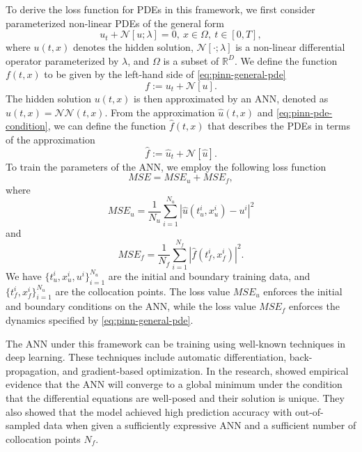 To derive the loss function for \glspl{PDE} in this framework, we first consider parameterized non-linear \glspl{PDE} of the general form
\begin{equation}
    u_t + \mathcal{N}[u; \lambda] = 0,\ x \in \Omega,\ t \in [0, T],
    \label{eq:pinn-general-pde}
\end{equation}
where $u(t, x)$ denotes the hidden solution, $\mathcal{N}[\cdot; \lambda]$ is a non-linear differential operator parameterized by $\lambda$, and $\Omega$ is a subset of $\mathbb{R}^D$.
We define the function $f(t, x)$ to be given by the left-hand side of \autoref{eq:pinn-general-pde}
\begin{equation}
    f := u_t + \mathcal{N}[u].
    \label{eq:pinn-pde-condition}
\end{equation}
The hidden solution $u(t, x)$ is then approximated by an \gls{ANN}, denoted as $\hat{u}(t, x) = \mathcal{NN}(t, x)$.
From the approximation $\hat{u}(t, x)$ and \autoref{eq:pinn-pde-condition}, we can define the function $\hat{f}(t, x)$ that describes the \glspl{PDE} in terms of the approximation
\begin{equation*}
    \hat{f} := \hat{u}_t + \mathcal{N}[\hat{u}].
\end{equation*}
To train the parameters of the \gls{ANN}, we employ the following loss function
\begin{equation*}
    MSE = MSE_u + MSE_f,
\end{equation*}
where
\begin{equation*}
    MSE_u = \frac{1}{N_u} \sum_{i=1}^{N_u} |\hat{u}(t_u^i, x_u^i) - u^i|^2
\end{equation*}
and
\begin{equation*}
    MSE_f = \frac{1}{N_f} \sum_{i=1}^{N_f} |\hat{f}(t_f^i, x_f^i)|^2.
\end{equation*}
We have $\{t_u^i, x_u^i, u^i\}_{i=1}^{N_u}$ are the initial and boundary training data, and $\{t_f^i, x_f^i\}_{i=1}^{N_u}$ are the collocation points.
The loss value $MSE_u$ enforces the initial and boundary conditions on the \gls{ANN}, while the loss value $MSE_f$ enforces the dynamics specified by \autoref{eq:pinn-general-pde}.

The \gls{ANN} under this framework can be training using well-known techniques in deep learning.
These techniques include automatic differentiation, back-propagation, and gradient-based optimization.
In the research, \citeauthor{raissiPhysicsinformedNeuralNetworks2019} showed empirical evidence that the \gls{ANN} will converge to a global minimum under the condition that the differential equations are well-posed and their solution is unique.
They also showed that the model achieved high prediction accuracy with out-of-sampled data when given a sufficiently expressive \gls{ANN} and a sufficient number of collocation points $N_f$.